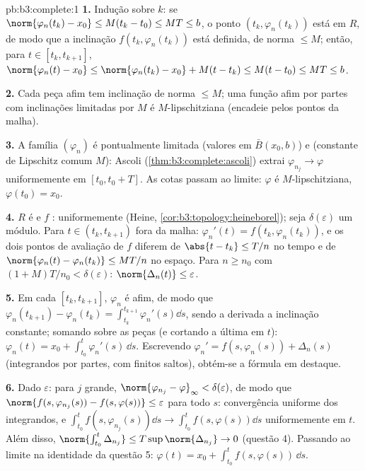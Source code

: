 \begin{solution}{pb:b3:complete:1}
\textbf{1.} Indução sobre $k$: se $\norm{\varphi_n(t_k) - x_0}
\leq M(t_k - t_0) \leq MT \leq b$, o ponto $(t_k,
\varphi_n(t_k))$ está em $R$, de modo que a inclinação $f(t_k,
\varphi_n(t_k))$ está definida, de norma $\leq M$; então, para $t \in
[t_k, t_{k+1}]$, $\norm{\varphi_n(t) - x_0} \leq
\norm{\varphi_n(t_k) - x_0} + M(t - t_k) \leq M(t - t_0) \leq
MT \leq b$.

\textbf{2.} Cada peça afim tem inclinação de norma $\leq M$; uma
função afim por partes com inclinações limitadas por $M$ é
$M$-lipschitziana (encadeie pelos pontos da malha).

\textbf{3.} A família $(\varphi_n)$ é pontualmente limitada
(valores em $\bar B(x_0, b)$) e  (constante de
Lipschitz comum $M$): Ascoli
(\cref{thm:b3:complete:ascoli}) extrai $\varphi_{n_j} \to
\varphi$ uniformemente em $[t_0, t_0 + T]$. As cotas passam ao
limite: $\varphi$ é $M$-lipschitziana, $\varphi(t_0) = x_0$.

\textbf{4.} $R$ é  e $f$ : uniformemente
 (Heine, \cref{cor:b3:topology:heineborel}); seja
$\delta(\varepsilon)$ um módulo. Para $t \in (t_k,
t_{k+1})$ fora da malha: $\varphi_n'(t) = f(t_k, \varphi_n(t_k))$, e os
dois pontos de avaliação de $f$ diferem de $\abs{t - t_k} \leq T/n$
no tempo e de $\norm{\varphi_n(t) - \varphi_n(t_k)} \leq MT/n$ no
espaço. Para $n \geq n_0$ com $(1 + M)T/n_0 < \delta(\varepsilon)$:
$\norm{\Delta_n(t)} \leq \varepsilon$.

\textbf{5.} Em cada $[t_k, t_{k+1}]$, $\varphi_n$ é afim, de modo que
$\varphi_n(t_{k+1}) - \varphi_n(t_k) = \int_{t_k}^{t_{k+1}}
\varphi_n'(s)\dd s$, sendo a derivada a inclinação constante;
somando sobre as peças (e cortando a última em $t$):
$\varphi_n(t) = x_0 + \int_{t_0}^t\varphi_n'(s)\,\dd s$.
Escrevendo $\varphi_n' = f(s, \varphi_n(s)) + \Delta_n(s)$
(integrandos  por partes, com finitos saltos), obtém-se
a fórmula em destaque.

\textbf{6.} Dado $\varepsilon$: para $j$ grande,
$\norm{\varphi_{n_j} - \varphi}_\infty < \delta(\varepsilon)$,
de modo que $\norm{f(s, \varphi_{n_j}(s)) - f(s, \varphi(s))} \leq
\varepsilon$ para todo $s$: convergência uniforme dos
integrandos, e $\int_{t_0}^t f(s,\varphi_{n_j}(s))\dd s \to
\int_{t_0}^tf(s, \varphi(s))\dd s$ uniformemente em $t$. Além disso,
$\norm{\int_{t_0}^t\Delta_{n_j}} \leq T\sup\norm{\Delta_{n_j}}
\to 0$ (questão 4). Passando ao limite na identidade da questão 5:
$\varphi(t) = x_0 + \int_{t_0}^tf(s,
\varphi(s))\,\dd s$.


\end{solution}
